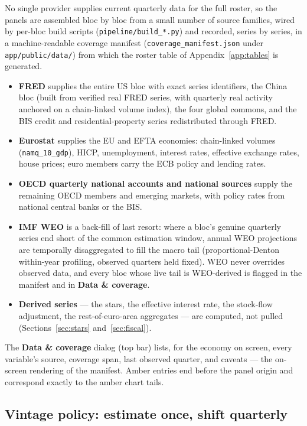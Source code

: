 \documentclass[11pt]{article}
\newcommand{\ui}[1]{\textbf{#1}}
\theoremstyle{plain}
\theoremstyle{remark}
\begin{document}
No single provider supplies current quarterly data for the full roster,
so the panels are assembled bloc by bloc from a small number of source
families, wired by per-bloc build scripts
(\texttt{pipeline/build\_*.py}) and recorded, series by
series, in a machine-readable coverage manifest
(\texttt{coverage\_manifest.json} under \texttt{app/public/data/}) from
which the
roster table of Appendix~\ref{app:tables} is generated.
\begin{itemize}
  \item \textbf{FRED} supplies the entire US bloc with exact series
    identifiers, the China bloc (built from verified real FRED series,
    with quarterly real activity anchored on a chain-linked volume
    index), the four global commons, and the BIS credit and
    residential-property series redistributed through FRED.
  \item \textbf{Eurostat} supplies the EU and EFTA economies:
    chain-linked volumes (\texttt{namq\_10\_gdp}), HICP, unemployment,
    interest rates, effective exchange rates, house prices; euro members
    carry the ECB policy and lending rates.
  \item \textbf{OECD quarterly national accounts and national sources}
    supply the remaining OECD members and emerging markets, with policy
    rates from national central banks or the BIS.
  \item \textbf{IMF WEO} is a back-fill of last resort: where a bloc's
    genuine quarterly series end short of the common estimation window,
    annual WEO projections are temporally disaggregated to fill the
    macro tail (proportional-Denton within-year profiling, observed
    quarters held fixed). WEO never overrides observed data, and every
    bloc whose live tail is WEO-derived is flagged in the manifest and
    in \ui{Data \& coverage}.
  \item \textbf{Derived series} --- the stars, the effective interest
    rate, the stock-flow adjustment, the rest-of-euro-area aggregates
    --- are computed, not pulled (Sections~\ref{sec:stars}
    and~\ref{sec:fiscal}).
\end{itemize}
The \ui{Data \& coverage} dialog (top bar) lists, for the economy on
screen, every variable's source, coverage span, last observed quarter,
and caveats --- the on-screen rendering of the manifest. Amber entries
end before the panel origin and correspond exactly to the amber chart
tails.

\subsection{Vintage policy: estimate once, shift quarterly}\label{sec:vintage}
\end{document}
